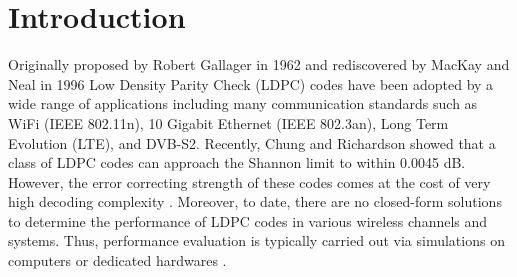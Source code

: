 \documentclass[conference]{IEEEtran}
\begin{document}
\begin{abstract}




\end{abstract}


\IEEEpeerreviewmaketitle



\section{Introduction}
Originally proposed by Robert Gallager in 1962 \cite{art_gallager} and rediscovered by MacKay and Neal in 1996 \cite{art_macKay} Low Density Parity Check (LDPC) codes have been adopted by a wide range of applications including many communication standards such as WiFi (IEEE 802.11n), 10 Gigabit Ethernet (IEEE 802.3an), Long Term Evolution (LTE), and DVB-S2. Recently, Chung and Richardson \cite{art_shannon} showed that a class of LDPC codes can approach the Shannon limit to within 0.0045 dB. However, the error correcting strength of these codes comes at the cost of very high decoding complexity \cite{art_ldpc_cpu1}. Moreover, to date, there are no closed-form solutions to determine the performance of LDPC codes in various wireless channels and systems. Thus, performance evaluation is typically carried out via simulations on computers or dedicated hardwares \cite{art_memory_coalesced}.
\end{document}
